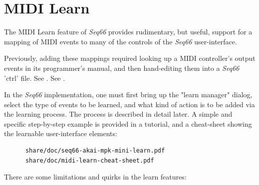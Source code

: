%
%
%

\section{MIDI Learn}
\label{sec:midi_learn}

   The MIDI Learn feature of
   \textsl{Seq66} provides rudimentary, but useful, support for a
   mapping of MIDI events to many of the controls of the
   \textsl{Seq66} user-interface.

   Previously, adding these mappings required looking up
   a MIDI controller's output events in its programmer's
   manual, and then hand-editing them into a
   \textsl{Seq66} 'ctrl' file.
   See .
   See .

   In the \textsl{Seq66} implementation, one must first bring up
   the "learn manager" dialog, select the type of events to
   be learned, and what kind of action is to be added via
   the learning process.
   The process is described in detail later.
   A simple and specific step-by-step example is provided in a tutorial, and
   a cheat-sheet showing the learnable user-interface elements:

   \begin{verbatim}
      share/doc/seq66-akai-mpk-mini-learn.pdf
      share/doc/midi-learn-cheat-sheet.pdf
   \end{verbatim}

   There are some limitations and quirks in the learn features:

